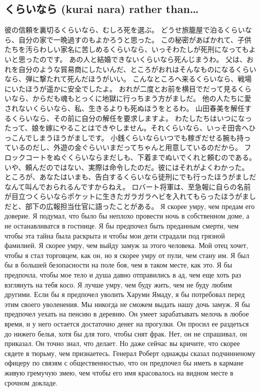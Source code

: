\subsection{くらいなら (kurai nara) rather than…}

彼の信頼を裏切るくらいなら、むしろ死を選ぶ。
どうせ旅籠屋で泊るくらいなら、自分の家で一晩過すのもよかろうと思った。
この秘密があばかれて、子供たちを汚らわしい家名に苦しめるくらいなら、いっそわたしが死刑になってもよいと思ったのです。
あの人と結婚できないくらいなら死んじまうわ。
父は、おれを自分のような貿易商にしたいんだ、ところがおれはそんなものになるくらいなら、弾に撃たれて死んだほうがいい。
こんなところへ来るくらいなら、戦場にいたほうが遥かに安全でしたよ。
おれが二度とお前を横目でだって見るくらいなら、からだも魂もとっくに地獄に行っちまう方がましだ。
他の人たちに愛されないくらいなら、私、生きるよりも死ぬほうをとるわ。
山田春美を解任するくらいなら、その前に自分の解任を要求しますよ。
わたしたちはいつになったって、娘を嫁にやることはできやしません。それくらいなら、いっそ田舎へひっこんでしまうほうがましです。
小銭くらいならいつでも稼ぎだせる腕も持っているのだし、外遊の金ぐらいいまだってちゃんと用意しているのだから。
フロックコートをぬぐくらいならまだしも、下着までぬいでくれと頼むのである。いや、頼んだのではない、実際は命令したのだ。彼にはそれがよくわかった。
ところが、あなたはいまも、告白するくらいなら徒刑にでも行ったほうがましだなんて叫んでおられるんですからねえ。
ロバート将軍は、至急報に自らの名前が目立つくらいならポケットに生きたガラガラヘビを入れてもらったほうがましだと、部下の広報担当仕官に語ったことがある。
Я скорее умру, чем предам его доверие.
Я подумал, что было бы неплохо провести ночь в собственном доме, а не останавливатся в гостнице.
Я бы предпочел быть преданным смерти, чем чтобы эта тайна была раскрыта и чтобы мои дети страдали под грязной фамилией.
Я скорее умру, чем выйду замуж за этого человека.
Мой отец хочет, чтобы я стал торговцем, как он, но я скорее умру от пули, чем стану им.
Я был бы в большей безопасности на поле боя, чем в таком месте, как это.
Я бы предпочла, чтобы мое тело и душа давно отправились в ад, чем еще хоть раз взглянуть на тебя косо.
Я лучше умру, чем буду жить, чем не буду любим другими.
Если бы я предпочел уволить Харуми Ямаду, я бы потребовал перед этим своего уволенения.
Мы никогда не сможем выдать нашу дочь замуж. Я бы предпочел уехать на пенсию в деревню.
Он умеет зарабатывать мелочь в любое время, и у него остается достаточно денег на прогулки.
Он просил ее раздеться до нижего белья, хотя бы для того, чтобы снят фрак. Нет, он не спрашивал, он приказал. Он точно знал, что делает.
Но даже сейчас вы кричите, что скорее сядете в тюрьму, чем признаетесь.
Генерал Роберт однажды сказал подчинненому офицеру по связям с общественностью, что он предпочел бы иметь в кармане живую гремучую змею, чем чтобы его имя красовалось на видном месте в срочном докладе.